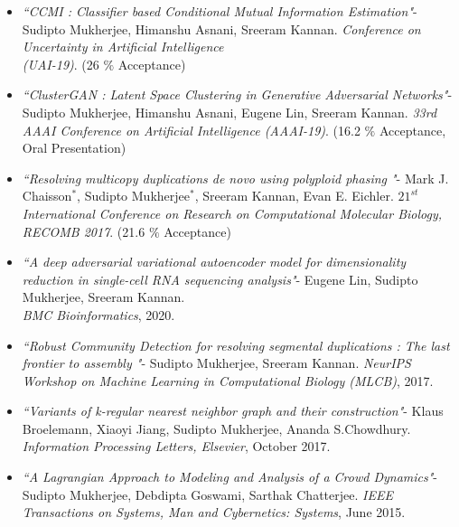 \documentclass[margin,line]{resume}
\begin{document}
\begin{resume}
\begin{itemize}
\item  \emph{``CCMI : Classifier based Conditional Mutual Information Estimation"}-  
Sudipto Mukherjee, Himanshu Asnani, Sreeram Kannan.  \emph{Conference on Uncertainty in Artificial Intelligence \\ (UAI-19)}. (26 $\%$ Acceptance)


\item  \emph{``ClusterGAN : Latent Space Clustering in Generative Adversarial Networks"}-  Sudipto Mukherjee, Himanshu Asnani, Eugene Lin, Sreeram Kannan. 
\emph{33rd AAAI Conference on Artificial Intelligence (AAAI-19)}. (16.2 $\%$ Acceptance, Oral Presentation)


\item  \emph{``Resolving multicopy duplications de novo using polyploid phasing "}-  
Mark J. Chaisson$^*$, Sudipto Mukherjee$^*$, Sreeram Kannan, Evan E. Eichler. 
\emph{$21^{st}$ International Conference on Research on Computational Molecular Biology, RECOMB 2017}. (21.6 $\%$ Acceptance)


\item  \emph{``A deep adversarial variational autoencoder model for dimensionality reduction in single-cell RNA sequencing analysis"}- Eugene Lin, Sudipto Mukherjee, Sreeram Kannan. \\ \textit{BMC Bioinformatics}, 2020.

\item  \emph{``Robust Community Detection for resolving segmental
duplications : The last frontier to assembly "}- Sudipto Mukherjee, Sreeram Kannan.  \emph{NeurIPS Workshop on Machine Learning in Computational Biology (MLCB)}, 2017.
 
\item  \emph{``Variants of k-regular nearest neighbor graph and their construction"}- 
Klaus Broelemann, Xiaoyi Jiang, Sudipto Mukherjee, Ananda S.Chowdhury. 
\emph{Information Processing Letters, Elsevier}, October 2017.

\item  \emph{``A Lagrangian Approach to Modeling and Analysis of a Crowd Dynamics"}- Sudipto Mukherjee, Debdipta Goswami, Sarthak Chatterjee.
\emph{IEEE Transactions on Systems, Man and Cybernetics: Systems}, June 2015.


\end{itemize}
\end{resume}
\end{document}
